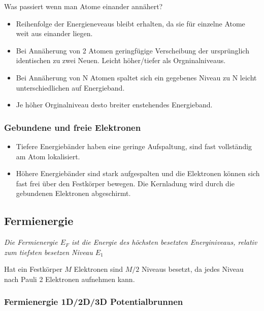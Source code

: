 \documentclass[10pt,a4paper]{scrartcl}
\begin{document}
\begin{multicols*}{3}
	Was passiert wenn man Atome einander annähert?
	
	\begin{itemize}
	\compaq
	\item Reihenfolge der Energieneveaus bleibt erhalten, da sie für einzelne Atome weit aus einander liegen.
	\item Bei Annäherung von 2 Atomen geringfügige Verscheibung der ursprünglich identischen zu zwei Neuen. Leicht höher/tiefer als Orgninalniveaus. 
	\item Bei Annäherung von N Atomen spaltet sich ein gegebenes Niveau zu N leicht unterschiedlichen auf \dahe Energieband.
	\item Je höher Orginalniveau desto breiter enstehendes Energieband.
	\end{itemize}
	
	
	\subsubsection{Gebundene und freie Elektronen}
	
	\begin{itemize}
	\compaq
	\item Tiefere Energiebänder haben eine geringe Aufspaltung, sind fast vollständig am Atom lokalisiert.
	\item Höhere Energiebänder sind stark aufgespalten und die Elektronen können sich fast frei über den Festkörper bewegen. Die Kernladung wird durch die gebundenen Elektronen abgeschirmt.
	\end{itemize}
	
	\subsection{Fermienergie}
	
	\emph{Die Fermienergie $E_F$ ist die Energie des höchsten besetzten Energiniveaus, relativ zum tiefsten besetzen Niveau $E_1$}

	\finn
	
	Hat ein Festkörper $M$ Elektronen sind $M/2$ Niveaus besetzt, da jedes Niveau nach Pauli 2 Elektronen aufnehmen kann.
	
	\subsubsection{Fermienergie 1D/2D/3D Potentialbrunnen}
	

\end{multicols*}
\end{document}
